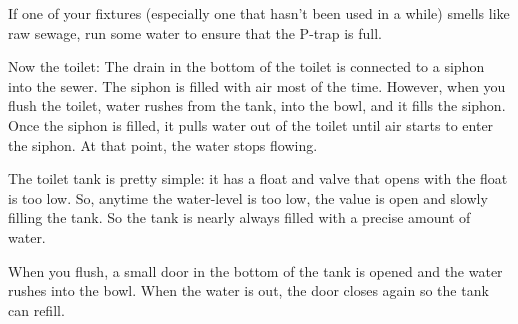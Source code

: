 If one of your fixtures (especially one that hasn't been used in a while) smells like raw sewage,  run
some water to ensure that the P-trap is full.

Now the toilet:  The drain in the bottom of the toilet is connected to a siphon into the sewer.   The siphon is filled with air most of the time.  However, when you flush the toilet,  water rushes from the tank, into the bowl,  and it fills the siphon.  Once the siphon is filled,  it pulls water out of the toilet until air starts to enter the siphon.  At that point,  the water stops flowing.

The toilet tank is pretty simple: it has a float and valve that opens with the float is too low.   So, anytime the water-level is too low,  the value is open and slowly filling the tank.   So the tank is nearly always filled with a precise amount of water.

When you flush,  a small door in the bottom of the tank is opened and the water rushes into the bowl.  When the water is out,  the door closes again so the tank can refill.

